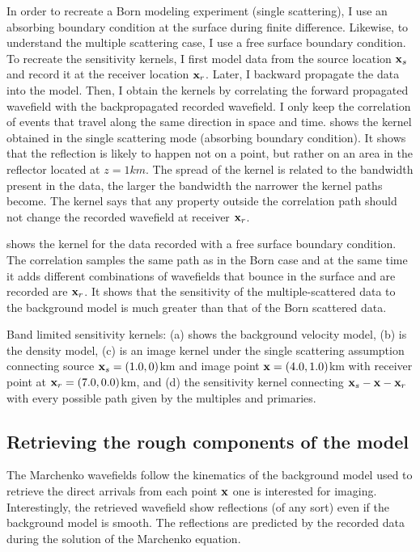  In order to recreate a Born modeling experiment (single scattering), I 
use an absorbing boundary condition at the surface during finite difference. Likewise,
 to understand the multiple scattering case, I use a free surface boundary condition. 
  To recreate the sensitivity kernels, I first model data from the source location ${\bf x}_s$ 
and record it at the receiver location ${\bf x}_r$. Later, I backward propagate the data
into the model. Then, I obtain the kernels by correlating the forward propagated
wavefield with the backpropagated recorded wavefield. I only keep the correlation 
of events that travel along the same direction in space  and time. 
    shows the kernel obtained in the single scattering 
mode (absorbing boundary condition). It shows that the reflection is likely 
to happen not on a point, but rather on an area in the reflector located at $z=1km$. The
spread of the kernel is related to the bandwidth present in the data, the larger the bandwidth
the narrower the kernel paths become. The kernel says that any property outside the correlation
path should not change the recorded wavefield at receiver ${\bf x}_r$. 

 shows the kernel for the data recorded with a free surface boundary
condition. The correlation samples the same path as in the Born case and at the same time
it adds different combinations of wavefields that bounce in the surface and are recorded are  ${\bf x}_r$. 
 It shows that the sensitivity of the multiple-scattered data to the background model is much 
greater than that of the Born scattered data.  





%
{Band limited sensitivity kernels: (a) shows the background velocity model, (b) is the density model, (c) is an image
kernel under the single scattering assumption connecting source ${\bf x}_s =(1.0,0)$km  and
  image point ${\bf x}=(4.0,1.0)$km with receiver point at ${\bf x}_r=(7.0,0.0)$km, and (d) the sensitivity 
kernel connecting ${\bf x}_s-{\bf x}-{\bf x}_r$ with every possible path given by the multiples and primaries. }


\subsection{Retrieving the rough components of the model}
  The Marchenko wavefields follow the kinematics of the background model used to retrieve
the direct arrivals from each point ${\bf x}$ one is interested for imaging. Interestingly, the 
retrieved wavefield show reflections (of any sort) even if the background model
is smooth. The reflections are predicted by the recorded data during the solution of the
Marchenko equation. 
 
